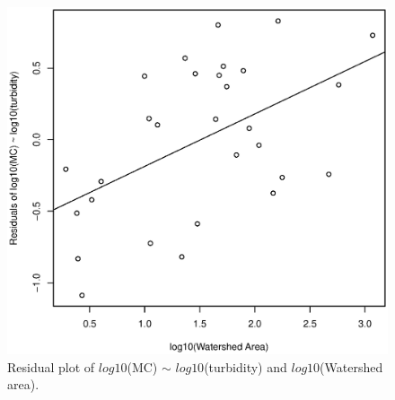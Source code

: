 \begin{figure}
	\includegraphics[width=\textwidth]{figures/residual}
	\caption{Residual plot of $log10$(MC) $\sim$ $log10$(turbidity) and $log10$(Watershed area).}
	\label{fig:residuals}
\end{figure}


